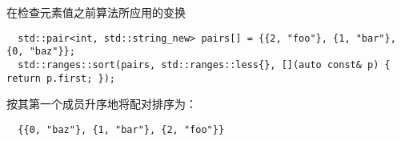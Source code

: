 在检查元素值之前算法所应用的变换

\begin{example}[\noindent]
\begin{lstlisting}
  std::pair<int, std::string_new> pairs[] = {{2, "foo"}, {1, "bar"}, {0, "baz"}};
  std::ranges::sort(pairs, std::ranges::less{}, [](auto const& p) { return p.first; });
\end{lstlisting}
按其第一个成员升序地将配对排序为：
\begin{lstlisting}
  {{0, "baz"}, {1, "bar"}, {2, "foo"}}
\end{lstlisting}
\end{example}
